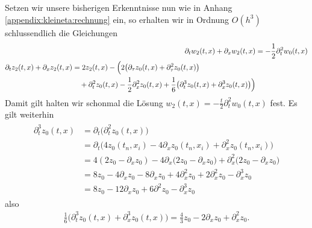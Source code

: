 Setzen wir unsere bisherigen Erkenntnisse nun wie in Anhang \ref{appendix:kleineta:rechnung} ein, so erhalten wir in Ordnung $O(h^3)$ schlussendlich die Gleichungen
\begin{align}
\partial_t w_2(t,x) + \partial_x w_2(t,x) &= - \frac{1}{2} \partial^2_t w_0(t,x)\\
\begin{split}
\partial_t z_2(t,x) + \partial_x z_2(t,x) &= 2 z_2(t,x) - \Bigl( 2 \bigl( \partial_\tau z_0(t,x) + \partial^2_\tau z_0(t,x) \bigr)\\
&\quad + \partial^2_t z_0(t,x) - \frac{1}{2} \partial^2_x z_0(t,x) + \frac{1}{6} \bigl(\partial^3_t z_0(t,x) + \partial^3_x z_0(t,x)\bigr) \Bigr)
\end{split}
\end{align}
Damit gilt halten wir schonmal die Lösung $w_2(t,x) = -\frac{t}{2} \partial^2_t w_0(t,x)$ fest.
Es gilt weiterhin
\begin{align}
\begin{split}
\partial^3_t z_0(t,x) &= \partial_t \bigl( \partial^2_t z_0(t,x) \bigr)\\
&= \partial_t \bigl( 4 z_0(t_n,x_i) - 4 \partial_x z_0(t_n,x_i) + \partial^2_x z_0(t_n,x_i) \bigr)\\
&= 4 ( 2z_0 - \partial_x z_0 ) - 4 \partial_x \bigl( 2z_0 - \partial_x z_0 \bigr) + \partial^2_x \bigl( 2 z_0 - \partial_x z_0 \bigr)\\
&= 8z_0 - 4 \partial_x z_0 - 8 \partial_x z_0 + 4 \partial^2_x z_0 + 2 \partial^2_x z_0 - \partial^3_x z_0\\
&= 8 z_0 - 12 \partial_x z_0 + 6 \partial^2 z_0 - \partial^3_x z_0
\end{split}
\end{align}
also
\begin{align}
\frac{1}{6} \bigl(\partial^3_t z_0(t,x) + \partial^3_x z_0(t,x)\bigr)
= \frac{4}{3} z_0 - 2 \partial_x z_0 + \partial^2_x z_0.
\end{align}



